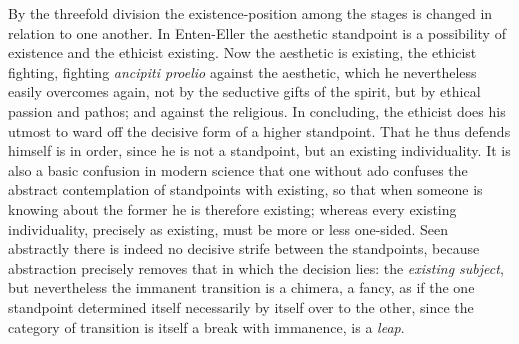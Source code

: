 \documentclass[12pt,a4paper,openany]{book}
\begin{document}
By the threefold division the existence-position among the stages is changed in
relation to one another. In Enten-Eller the aesthetic standpoint is a possibility of
existence and the ethicist existing. Now the aesthetic is existing, the ethicist
fighting, fighting \textit{ancipiti proelio} against the aesthetic, which he
nevertheless easily overcomes again, not by the seductive gifts of the spirit, but by
ethical passion and pathos; and against the religious. In concluding, the ethicist does
his utmost to ward off the decisive form of a higher standpoint. That he thus defends
himself is in order, since he is not a standpoint, but an existing individuality. It is
also a basic confusion in modern science that one without ado confuses the abstract
contemplation of standpoints with existing, so that when someone is knowing about the
former he is therefore existing; whereas every existing individuality, precisely as
existing, must be more or less one-sided. Seen abstractly there is indeed no decisive
strife between the standpoints, because abstraction precisely removes that in which the
decision lies: the \emph{existing subject}, but nevertheless the immanent transition is
a chimera, a fancy, as if the one standpoint determined itself necessarily by itself
over to the other, since the category of transition is itself a break with immanence,
is a \emph{leap}.
\end{document}
